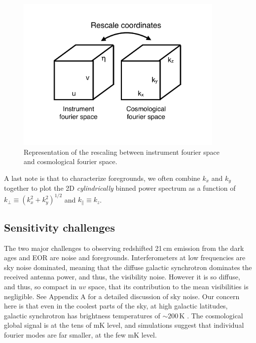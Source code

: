 \begin{figure}[h]
    \centering
    \includegraphics[width=0.9\textwidth]{chap0_intro/ifo_space_cosmo.pdf}
    \caption{Representation of the rescaling between instrument fourier space and cosmological fourier space.}
    \label{fig:ifospacecosmo}
\end{figure}

A last note is that to characterize foregrounds, we often combine $k_x$ and $k_y$ together to plot the 2D \textit{cylindrically} binned power spectrum as a function of $k_\perp\equiv(k_x^2+k_y^2)^{1/2}$ and $k_\parallel\equiv k_z$.




\subsection{Sensitivity challenges}
\label{sec:sensitivity}

The two major challenges to observing redshifted 21\,cm emission from the dark ages and EOR are noise and foregrounds. Interferometers at low frequencies are sky noise dominated, meaning that the diffuse galactic synchrotron dominates the received antenna power, and thus, the visibility noise. However it is so diffuse, and thus, so compact in $uv$ space, that its contribution to the mean visibilities is negligible. See Appendix A for a detailed discussion of sky noise. Our concern here is that even in the coolest parts of the sky, at high galactic latitudes, galactic synchrotron has brightness temperatures of $\sim200$\,K \citep{Tsysmemo}. The cosmological global signal is at the tens of mK level, and simulations suggest that individual fourier modes are far smaller, at the few mK level. 

